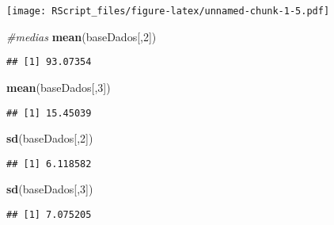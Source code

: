 \documentclass[]{article}
\newenvironment{Shaded}{\begin{snugshade}}{\end{snugshade}}
\newcommand{\KeywordTok}[1]{\textcolor[rgb]{0.13,0.29,0.53}{\textbf{#1}}}
\newcommand{\DecValTok}[1]{\textcolor[rgb]{0.00,0.00,0.81}{#1}}
\newcommand{\CommentTok}[1]{\textcolor[rgb]{0.56,0.35,0.01}{\textit{#1}}}
\newcommand{\NormalTok}[1]{#1}
\begin{document}
\texttt{[image: RScript\_files/figure-latex/unnamed-chunk-1-5.pdf]}

\begin{Shaded}
\begin{Highlighting}[]
\CommentTok{#medias}
\KeywordTok{mean}\NormalTok{(baseDados[,}\DecValTok{2}\NormalTok{])}
\end{Highlighting}
\end{Shaded}

\begin{verbatim}
## [1] 93.07354
\end{verbatim}

\begin{Shaded}
\begin{Highlighting}[]
\KeywordTok{mean}\NormalTok{(baseDados[,}\DecValTok{3}\NormalTok{])}
\end{Highlighting}
\end{Shaded}

\begin{verbatim}
## [1] 15.45039
\end{verbatim}

\begin{Shaded}
\begin{Highlighting}[]
\KeywordTok{sd}\NormalTok{(baseDados[,}\DecValTok{2}\NormalTok{])}
\end{Highlighting}
\end{Shaded}

\begin{verbatim}
## [1] 6.118582
\end{verbatim}

\begin{Shaded}
\begin{Highlighting}[]
\KeywordTok{sd}\NormalTok{(baseDados[,}\DecValTok{3}\NormalTok{])}
\end{Highlighting}
\end{Shaded}

\begin{verbatim}
## [1] 7.075205
\end{verbatim}
\end{document}

